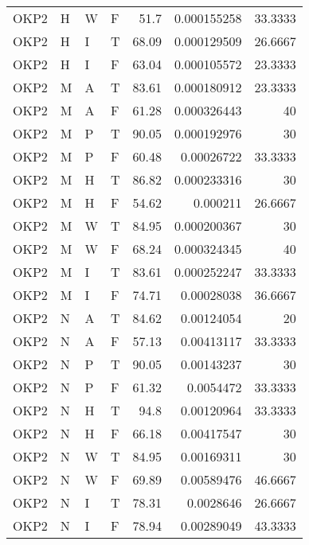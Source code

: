 \begin{table}[htb!]
{\begin{tabular}{llllrrr}
            OKP2     & H     & W     & F          & 51.7       & 0.000155258 & 33.3333  \\
            OKP2     & H     & I     & T          & 68.09      & 0.000129509 & 26.6667  \\
            OKP2     & H     & I     & F          & 63.04      & 0.000105572 & 23.3333  \\
            OKP2     & M     & A     & T          & 83.61      & 0.000180912 & 23.3333  \\
            OKP2     & M     & A     & F          & 61.28      & 0.000326443 & 40       \\
            OKP2     & M     & P     & T          & 90.05      & 0.000192976 & 30       \\
            OKP2     & M     & P     & F          & 60.48      & 0.00026722  & 33.3333  \\
            OKP2     & M     & H     & T          & 86.82      & 0.000233316 & 30       \\
            OKP2     & M     & H     & F          & 54.62      & 0.000211    & 26.6667  \\
            OKP2     & M     & W     & T          & 84.95      & 0.000200367 & 30       \\
            OKP2     & M     & W     & F          & 68.24      & 0.000324345 & 40       \\
            OKP2     & M     & I     & T          & 83.61      & 0.000252247 & 33.3333  \\
            OKP2     & M     & I     & F          & 74.71      & 0.00028038  & 36.6667  \\
            OKP2     & N     & A     & T          & 84.62      & 0.00124054  & 20       \\
            OKP2     & N     & A     & F          & 57.13      & 0.00413117  & 33.3333  \\
            OKP2     & N     & P     & T          & 90.05      & 0.00143237  & 30       \\
            OKP2     & N     & P     & F          & 61.32      & 0.0054472   & 33.3333  \\
            OKP2     & N     & H     & T          & 94.8       & 0.00120964  & 33.3333  \\
            OKP2     & N     & H     & F          & 66.18      & 0.00417547  & 30       \\
            OKP2     & N     & W     & T          & 84.95      & 0.00169311  & 30       \\
            OKP2     & N     & W     & F          & 69.89      & 0.00589476  & 46.6667  \\
            OKP2     & N     & I     & T          & 78.31      & 0.0028646   & 26.6667  \\
            OKP2     & N     & I     & F          & 78.94      & 0.00289049  & 43.3333  \\
            \hline
        \end{tabular}
    }{
    }
\end{table} 
